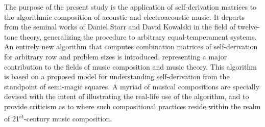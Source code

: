 The purpose of the present study is the application of self-derivation matrices to the algorithmic composition of acoustic and electroacoustic music. It departs from the seminal works of Daniel Starr and David Kowalski in the field of twelve-tone theory, generalizing the procedure to arbitrary equal-temperament systems. An entirely new algorithm that computes combination matrices of self-derivation for arbitrary row and problem sizes is introduced, representing a major contribution to the fields of music composition and music theory. This algorithm is based on a proposed model for understanding self-derivation from the standpoint of semi-magic squares. A myriad of musical compositions are specially devised with the intent of illustrating the real-life use of the algorithm, and to provide criticism as to where such compositional practices reside within the realm of 21\textsuperscript{st}-century music composition.